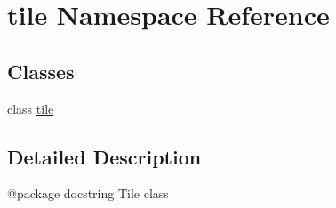 \hypertarget{namespacetile}{}\section{tile Namespace Reference}
\label{namespacetile}
\subsection*{Classes}
\begin{DoxyCompactItemize}
\item 
class \mbox{\hyperlink{classtile_1_1tile}{tile}}
\end{DoxyCompactItemize}


\subsection{Detailed Description}
\begin{DoxyVerb}@package docstring
Tile class
\end{DoxyVerb}
 